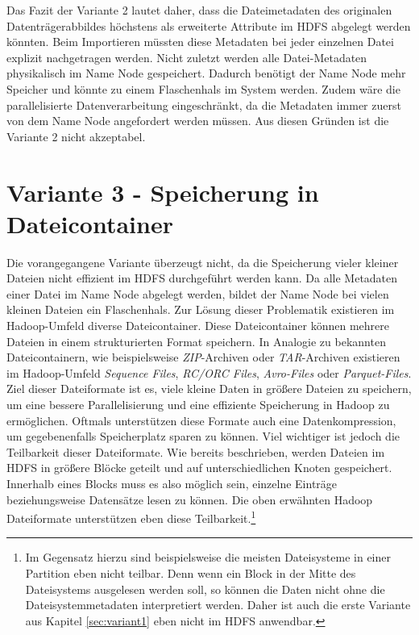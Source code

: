 \noindent
Das Fazit der Variante 2 lautet daher, dass die Dateimetadaten des originalen Datenträgerabbildes höchstens als erweiterte Attribute im HDFS abgelegt werden könnten. Beim Importieren müssten diese Metadaten bei jeder einzelnen Datei explizit nachgetragen werden. Nicht zuletzt werden alle Datei-Metadaten physikalisch im Name Node gespeichert. Dadurch benötigt der Name Node mehr Speicher und könnte zu einem Flaschenhals im System werden. Zudem wäre die parallelisierte Datenverarbeitung eingeschränkt, da die Metadaten immer zuerst von dem Name Node angefordert werden müssen. Aus diesen Gründen ist die Variante 2 nicht akzeptabel. 

\section{Variante 3 - Speicherung in Dateicontainer}

Die vorangegangene Variante überzeugt nicht, da die Speicherung vieler kleiner Dateien nicht effizient im HDFS durchgeführt werden kann. Da alle Metadaten einer Datei im Name Node abgelegt werden, bildet der Name Node bei vielen kleinen Dateien ein Flaschenhals. Zur Lösung dieser Problematik existieren im Hadoop-Umfeld diverse Dateicontainer. 
Diese Dateicontainer können mehrere Dateien in einem strukturierten Format speichern. In Analogie zu bekannten Dateicontainern, wie beispielsweise \textit{ZIP}-Archiven oder \textit{TAR}-Archiven existieren im Hadoop-Umfeld \textit{Sequence Files}, \textit{RC/ORC Files}, \textit{Avro-Files} oder \textit{Parquet-Files}.\cite[S. 296]{expert_hadoop_admin} \\
Ziel dieser Dateiformate ist es, viele kleine Daten in größere Dateien zu speichern, um eine bessere Parallelisierung und eine effiziente Speicherung in Hadoop zu ermöglichen. Oftmals unterstützen diese Formate auch eine Datenkompression, um gegebenenfalls Speicherplatz sparen zu können. Viel wichtiger ist jedoch die Teilbarkeit dieser Dateiformate. Wie bereits beschrieben, werden Dateien im HDFS in größere Blöcke geteilt und auf unterschiedlichen Knoten gespeichert. 
Innerhalb eines Blocks muss es also möglich sein, einzelne Einträge beziehungsweise Datensätze lesen zu können. Die oben erwähnten Hadoop Dateiformate unterstützen eben diese Teilbarkeit.\footnote{Im Gegensatz hierzu sind beispielsweise die meisten Dateisysteme in einer Partition eben nicht teilbar. Denn wenn ein Block in der Mitte des Dateisystems ausgelesen werden soll, so können die Daten nicht ohne die Dateisystemmetadaten interpretiert werden. Daher ist auch die erste Variante aus Kapitel \ref{sec:variant1} eben nicht im HDFS anwendbar.}\\

